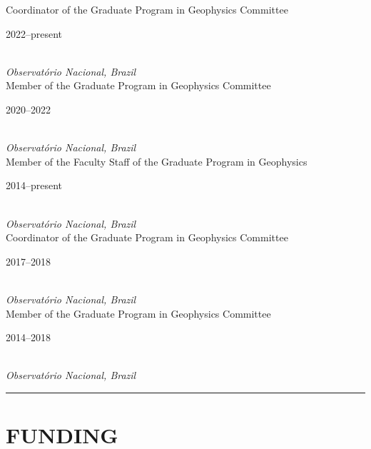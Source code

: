 \documentclass[11pt,a4paper,onecolumn]{article}
\begin{document}
\medskip
	
\noindent Coordinator of the Graduate Program in Geophysics Committee \hfill \parbox{0.1\textwidth}{\raggedright 2022--present} \\
\noindent \textsl{Observat\'{o}rio Nacional, Brazil} \vspace{0.5\baselineskip} \\
\noindent Member of the Graduate Program in Geophysics Committee \hfill \parbox{0.1\textwidth}{\raggedright 2020--2022} \\
\noindent \textsl{Observat\'{o}rio Nacional, Brazil} \vspace{0.5\baselineskip} \\
\noindent Member of the Faculty Staff of the Graduate Program in Geophysics \hfill \parbox{0.1\textwidth}{\raggedright 2014--present} \\
\noindent \textsl{Observat\'{o}rio Nacional, Brazil} \vspace{0.5\baselineskip} \\
\noindent Coordinator of the Graduate Program in Geophysics Committee \hfill \parbox{0.1\textwidth}{\raggedright 2017--2018} \\
\noindent \textsl{Observat\'{o}rio Nacional, Brazil} \vspace{0.5\baselineskip} \\
\noindent Member of the Graduate Program in Geophysics Committee \hfill \parbox{0.1\textwidth}{\raggedright 2014--2018} \\
\noindent \textsl{Observat\'{o}rio Nacional, Brazil} \vspace{0.5\baselineskip} \\


\bigskip \hrule

\section*{FUNDING}
\end{document}
